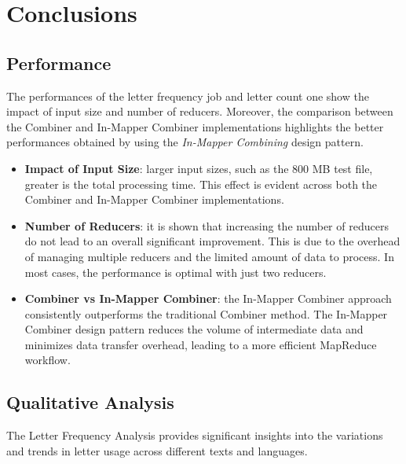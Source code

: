 \newpage
\section{Conclusions}

\subsection{Performance}

The performances of the letter frequency job and letter count one show the impact of input size and number of reducers. Moreover, the comparison between the Combiner and In-Mapper Combiner implementations highlights the better performances obtained by using the \textit{In-Mapper Combining} design pattern.

\begin{itemize}
\item \textbf{Impact of Input Size}: larger input sizes, such as the 800 MB test file, greater is the total processing time. This effect is evident across both the Combiner and In-Mapper Combiner implementations.
\item \textbf{Number of Reducers}: it is shown that increasing the number of reducers do not lead to an overall significant improvement. This is due to the overhead of managing multiple reducers and the limited amount of data to process. In most cases, the performance is optimal with just two reducers.

\item \textbf{Combiner vs In-Mapper Combiner}: the In-Mapper Combiner approach consistently outperforms the traditional Combiner method. The In-Mapper Combiner design pattern reduces the volume of intermediate data and minimizes data transfer overhead, leading to a more efficient MapReduce workflow.
\end{itemize}


\subsection{Qualitative Analysis}

The Letter Frequency Analysis provides significant insights into the variations and trends in letter usage across different texts and languages.

